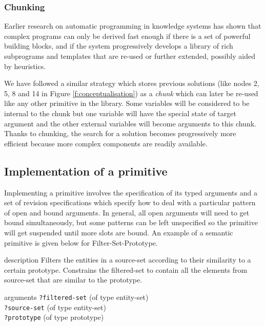 \subsubsection{Chunking}
\label{s:irl-chunking}

Earlier research on automatic programming in knowledge systems
\citep[see e.g.][]{barstow79knowledge} has shown that complex programs
can only be derived fast enough if there is a set of powerful building
blocks, and if the system progressively develops a library of rich
subprograms and templates that are re-used or further extended,
possibly aided by heuristics.

We have followed a similar strategy which stores previous solutions
(like nodes 2, 5, 8 and 14 in Figure \ref{f:conceptualisation}) as a
\emph{chunk} which can later be re-used like any other primitive in
the library. Some variables will be considered to be internal to the
chunk but one variable will have the special state of target argument
and the other external variables will become arguments to this
chunk. Thanks to chunking, the search for a solution becomes
progressively more efficient because more complex components are
readily available.

\subsection{Implementation of a primitive}

Implementing a primitive involves the specification of its typed
arguments and a set of revision specifications which specify how to
deal with a particular pattern of open and bound arguments. In
general, all open arguments will need to get bound simultaneously, but
some patterns can be left unspecified so the primitive will get
suspended until more slots are bound. An example of a semantic
primitive is given below for {\sc Filter-Set-Prototype}.


\begin{explanation}{description}
  Filters the entities in a source-set according to their similarity
  to a certain prototype. Constrains the filtered-set to contain all
  the elements from source-set that are similar to the prototype.
\end{explanation}

\begin{explanation}{arguments}
\verb+?filtered-set+ (of type entity-set) \\
\verb+?source-set+ (of type entity-set) \\
\verb+?prototype+ (of type prototype)
\end{explanation}

